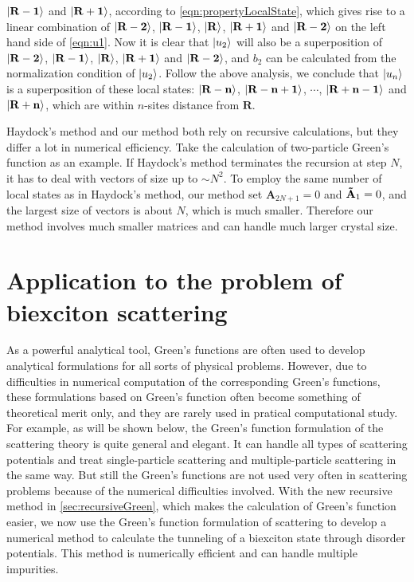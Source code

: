 $|  \mathbf{R-1} \rangle$ and $|  \mathbf{R+1} \rangle$, according to
 \autoref{eqn:propertyLocalState}, which gives rise to a linear combination of $|  \mathbf{R-2} \rangle$, 
$|  \mathbf{R-1} \rangle$, $|  \mathbf{R} \rangle$, $|  \mathbf{R+1} \rangle$ and $|  \mathbf{R-2} \rangle$ on the left hand side
 of \autoref{eqn:u1}. Now it is clear that $| u_2 \rangle$ will also be a superposition of $|  \mathbf{R-2} \rangle$, 
$|  \mathbf{R-1} \rangle$, $|  \mathbf{R} \rangle$, $|  \mathbf{R+1} \rangle$ and $|  \mathbf{R-2} \rangle$, and $b_2$ can be
calculated from the normalization condition of $| u_2 \rangle$. Follow the above analysis, we conclude that 
$| u_n \rangle$ is a superposition of these local states: $|  \mathbf{R-n} \rangle$, 
$|  \mathbf{R-n+1} \rangle$, $\cdots$, $|  \mathbf{R+n-1} \rangle$ and $|  \mathbf{R+n} \rangle$, which are within $n$-sites
distance from $\mathbf{R}$. 

Haydock's method and our method both rely on recursive calculations, but they differ a lot in numerical efficiency. 
Take the calculation of two-particle Green's function as an example.  If Haydock's 
method terminates the recursion at step $N$, it has to deal with vectors of size up to $\sim N^2$. 
To employ 
the same number of local states as in Haydock's method, our method set $\mathbf{A}_{2N+1}=0$ and
 $\mathbf{\Tilde{A} }_{1}=0$, and the largest size of vectors is about $N$, which is much smaller. Therefore
our method involves much smaller matrices and can handle much larger crystal size. 




\section{Application to the problem of biexciton scattering}
\label{sec:biexcitonScattering}

As a powerful analytical tool, Green's functions are often used to develop analytical formulations for  all sorts of physical 
problems. 
However, due to difficulties in numerical computation of the corresponding Green's functions, 
these formulations based on Green's function often become something of  theoretical merit only, and they are rarely used in pratical computational 
study. For example, as will be shown below, the Green's function formulation of the scattering theory is quite general and 
elegant. It 
can handle all types of scattering potentials and treat  single-particle scattering and multiple-particle scattering in the
 same way. But still the Green's functions are not used very often in scattering problems because of the numerical difficulties
 involved\cite{Berciu2010}.  With the new recursive
 method in \autoref{sec:recursiveGreen}, which makes the calculation of Green's function easier, we now use the Green's
 function formulation of scattering to develop a numerical method to calculate the tunneling of a biexciton state through 
 disorder potentials. This method is numerically efficient and can handle multiple impurities. 

